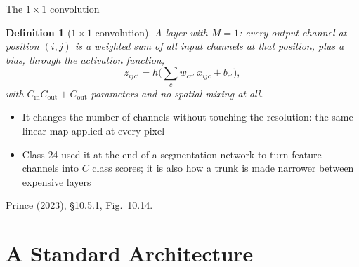 \documentclass[aspectratio=169, 11pt]{beamer}
\newtheorem{defx}[theorem]{Definition}
\newcommand{\srcline}[1]{%
  \par\vspace{0.25em}%
  {\scriptsize\color{mcMuted}\hfill #1\par}}
\begin{document}
\begin{frame}{The $1 \times 1$ convolution}
  \vspace{-0.3em}
  \begin{defx}[$1 \times 1$ convolution]\label{th:onebyone}
    \small
    A layer with $M = 1$: every output channel at position $(i, j)$ is
    a weighted sum of all input channels \emph{at that position}, plus
    a bias, through the activation function,
    \[
      z_{ijc'} = h\Big( \textstyle\sum_{c} w_{cc'}\, x_{ijc} + b_{c'} \Big),
    \]
    with $C_{\mathrm{in}} C_{\mathrm{out}} + C_{\mathrm{out}}$ parameters and no
    spatial mixing at all.
  \end{defx}
  \vspace{0.2em}
  {\footnotesize
  \begin{itemize}\itemsep0.24em
    \item It changes the number of channels without touching the
          resolution: the same linear map applied at every pixel
    \item Class 24 used it at the end of a segmentation network to
          turn feature channels into $C$ class scores; it is also how
          a trunk is made narrower between expensive layers
  \end{itemize}}
  \srcline{Prince (2023), \S10.5.1, Fig.~10.14.}
\end{frame}

\section{A Standard Architecture}
\end{document}
